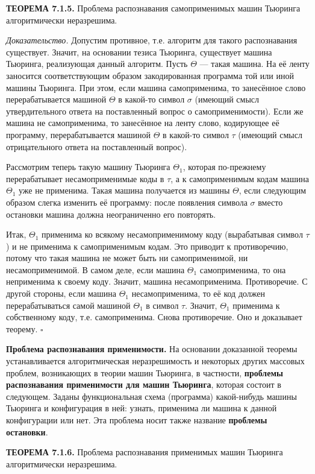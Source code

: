 \documentclass[a4paper,12pt]{article}
\begin{document}
\textbf{ТЕОРЕМА 7.1.5.} Проблема распознавания самоприменимых машин Тьюринга алгоритмически неразрешима.

\textit{Доказательство.} Допустим противное, т.е. алгоритм для такого распознавания существует. Значит, на основании тезиса Тьюринга, существует машина Тьюринга, реализующая данный алгоритм. Пусть \(\Theta\) --- такая машина. На её ленту заносится соответствующим образом закодированная программа той или иной машины Тьюринга. При этом, если машина самоприменима, то занесённое слово перерабатывается машиной \(\Theta\) в какой-то символ \(\sigma\) (имеющий смысл утвердительного ответа на поставленный вопрос о самоприменимости). Если же машина не самоприменима, то занесённое на ленту слово, кодирующее её программу, перерабатывается машиной \(\Theta\) в какой-то символ \(\tau\) (имеющий смысл отрицательного ответа на поставленный вопрос).

Рассмотрим теперь такую машину Тьюринга \(\Theta_1\), которая по-прежнему перерабатывает несамоприменимые коды в \(\tau\), а к самоприменимым кодам машина \(\Theta_1\) уже не применима. Такая машина получается из машины \(\Theta\), если следующим образом слегка изменить её программу: после появления символа \(\sigma\) вместо остановки машина должна неограниченно его повторять.

Итак, \(\Theta_1\) применима ко всякому несамоприменимому коду (вырабатывая символ \(\tau\)) и не применима к самоприменимым кодам. Это приводит к противоречию, потому что такая машина не может быть ни самоприменимой, ни несамоприменимой. В самом деле, если машина \(\Theta_1\) самоприменима, то она неприменима к своему коду. Значит, машина несамоприменима. Противоречие. С другой стороны, если машина \(\Theta_1\) несамоприменима, то её код должен перерабатываться самой машиной \(\Theta_1\) в символ \(\tau\). Значит, \(\Theta_1\) применима к собственному коду, т.е. самоприменима. Снова противоречие. Оно и доказывает теорему. \(\square\)

\textbf{Проблема распознавания применимости.} На основании доказанной теоремы устанавливается алгоритмическая неразрешимость и некоторых других массовых проблем, возникающих в теории машин Тьюринга, в частности, \textbf{проблемы распознавания применимости для машин Тьюринга}, которая состоит в следующем. Заданы функциональная схема (программа) какой-нибудь машины Тьюринга и конфигурация в ней: узнать, применима ли машина к данной конфигурации или нет. Эта проблема носит также название \textbf{проблемы остановки}.

\textbf{ТЕОРЕМА 7.1.6.} Проблема распознавания применимых машин Тьюринга алгоритмически неразрешима.
\end{document}
